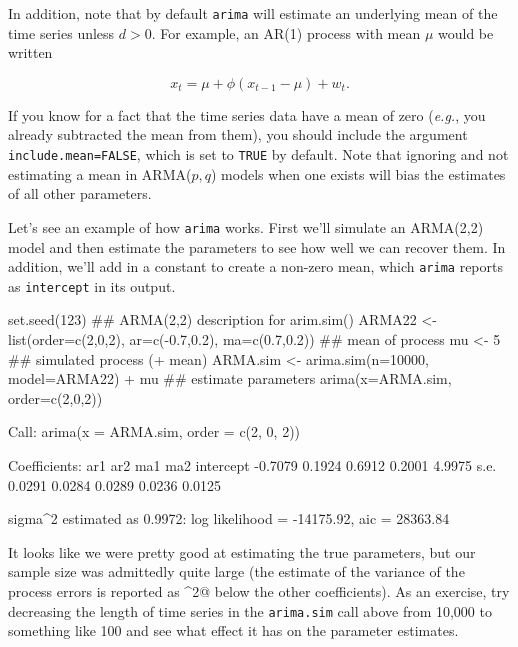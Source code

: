 \noindent In addition, note that by default \texttt{arima} will estimate an underlying mean of the time series unless $d>0$.  For example, an AR(1) process with mean $\mu$ would be written

\begin{equation}\label{eqn:AR1mean}
x_t = \mu + \phi (x_{t-1} - \mu) + w_t.
\end{equation}

\noindent If you know for a fact that the time series data have a mean of zero (\emph{e.g.}, you already subtracted the mean from them), you should include the argument \texttt{include.mean=FALSE}, which is set to \texttt{TRUE} by default.  Note that ignoring and not estimating a mean in ARMA($p,q$) models when one exists will bias the estimates of all other parameters.

Let's see an example of how \texttt{arima} works.  First we'll simulate an ARMA(2,2) model and then estimate the parameters to see how well we can recover them.  In addition, we'll add in a constant to create a non-zero mean, which \texttt{arima} reports as \texttt{intercept} in its output.

\begin{Schunk}
\begin{Sinput}
 set.seed(123)
 ## ARMA(2,2) description for arim.sim()
 ARMA22 <- list(order=c(2,0,2), ar=c(-0.7,0.2), ma=c(0.7,0.2))
 ## mean of process
 mu <- 5
 ## simulated process (+ mean)
 ARMA.sim <- arima.sim(n=10000, model=ARMA22) + mu
 ## estimate parameters
 arima(x=ARMA.sim, order=c(2,0,2))
\end{Sinput}
\begin{Soutput}
Call:
arima(x = ARMA.sim, order = c(2, 0, 2))

Coefficients:
          ar1     ar2     ma1     ma2  intercept
      -0.7079  0.1924  0.6912  0.2001     4.9975
s.e.   0.0291  0.0284  0.0289  0.0236     0.0125

sigma^2 estimated as 0.9972:  log likelihood = -14175.92,  aic = 28363.84
\end{Soutput}
\end{Schunk}

It looks like we were pretty good at estimating the true parameters, but our sample size was admittedly quite large (the estimate of the variance of the process errors is reported as \verb@sigma^2@ below the other coefficients).  As an exercise, try decreasing the length of time series in the  \texttt{arima.sim} call above from 10,000 to something like 100 and see what effect it has on the parameter estimates.


